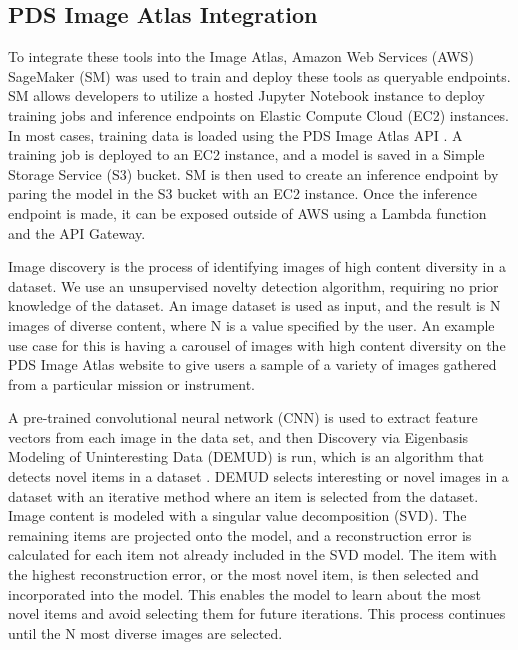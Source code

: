 \subsection{PDS Image Atlas Integration}
To integrate these tools into the Image Atlas, Amazon Web Services (AWS) SageMaker (SM) was used to train and deploy these tools as queryable endpoints. 
SM allows developers to utilize a hosted Jupyter Notebook instance to deploy training jobs and inference endpoints on Elastic Compute Cloud (EC2) instances. 
In most cases, training data is loaded using the PDS Image Atlas API \parencite{grimes2018pds}. 
A training job is deployed to an EC2 instance, and a model is saved in a Simple Storage Service (S3) bucket. 
SM is then used to create an inference endpoint by paring the model in the S3 bucket with an EC2 instance. 
Once the inference endpoint is made, it can be exposed outside of AWS using a Lambda function and the API Gateway.

Image discovery is the process of identifying images of high content diversity in a dataset.
We use an unsupervised novelty detection algorithm, requiring no prior knowledge of the dataset. 
An image dataset is used as input, and the result is N images of diverse content, where N is a value specified by the user. 
An example use case for this is having a carousel of images with high content diversity on the PDS Image Atlas website to give users a sample of a variety of images gathered from a particular mission or instrument.

A pre-trained convolutional neural network (CNN) is used to extract feature vectors from each image in the data set, and then Discovery via Eigenbasis Modeling of Uninteresting Data (DEMUD) is run, which is an algorithm that detects novel items in a dataset \parencite{wagstaff_demud}.
DEMUD selects interesting or novel images in a dataset with an iterative method where an item is selected from the dataset. 
Image content is modeled with a singular value decomposition (SVD). 
The remaining items are projected onto the model, and a reconstruction error is calculated for each item not already included in the SVD model. 
The item with the highest reconstruction error, or the most novel item, is then selected and incorporated into the model. 
This enables the model to learn about the most novel items and avoid selecting them for future iterations. 
This process continues until the N most diverse images are selected. 
